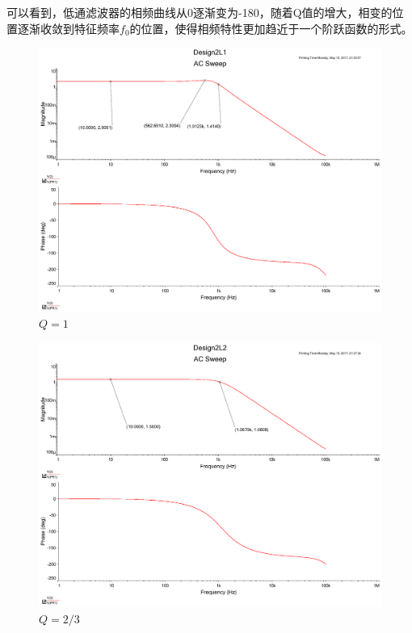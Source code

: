 \documentclass[UTF8,a4paper]{paper}
\begin{document}
可以看到，低通滤波器的相频曲线从0逐渐变为-180，随着Q值的增大，相变的位置逐渐收敛到特征频率$f_0$的位置，使得相频特性更加趋近于一个阶跃函数的形式。
\begin{multicols}{3}
\begin{figure}[H]
\centering
\includegraphics[width=\columnwidth]{2L1.pdf}
\caption{$Q=1$}
\label{LQ1}
\end{figure}
\begin{figure}[H]
\centering
\includegraphics[width=\columnwidth]{2L2_3.pdf}
\caption{$Q=2/3$}
\label{LQ23}
\end{figure}
\begin{figure}[H]
\centering

\end{figure}
\end{multicols}
\end{document}

